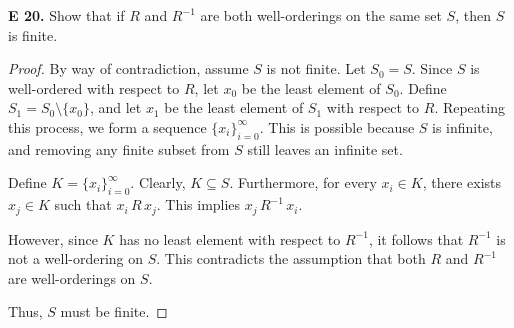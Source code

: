 \begin{question}
    \textbf{E 20.} 
    Show that if \(R\) and \(R^{-1}\) are both well-orderings on the same set \(S\), then \(S\) is finite.
\end{question}
\begin{proof}
    By way of contradiction, assume \(S\) is not finite. Let \(S_0 = S\). Since \(S\) is well-ordered with respect to \(R\), let \(x_0\) be the least element of \(S_0\). Define \(S_1 = S_0 \setminus \{x_0\}\), and let \(x_1\) be the least element of \(S_1\) with respect to \(R\). Repeating this process, we form a sequence \(\{x_i\}_{i=0}^\infty\). This is possible because \(S\) is infinite, and removing any finite subset from \(S\) still leaves an infinite set.

    Define \(K = \{x_i\}_{i=0}^\infty\). Clearly, \(K \subseteq S\). Furthermore, for every \(x_i \in K\), there exists \(x_j \in K\) such that \(x_i \, R \, x_j\). This implies \(x_j \, R^{-1} \, x_i\).

    However, since \(K\) has no least element with respect to \(R^{-1}\), it follows that \(R^{-1}\) is not a well-ordering on \(S\). This contradicts the assumption that both \(R\) and \(R^{-1}\) are well-orderings on \(S\). 

    Thus, \(S\) must be finite.
\end{proof}